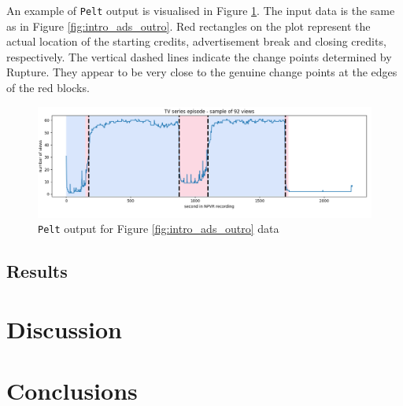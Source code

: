 An example of \texttt{Pelt} output is visualised in Figure \ref{fig:ruptures_change_detection}. The input data is the same as in Figure \ref{fig:intro_ads_outro}. Red rectangles on the plot represent the actual location of the starting credits, advertisement break and closing credits, respectively. The vertical dashed lines indicate the change points determined by Rupture. They appear to be very close to the genuine change points at the edges of the red blocks.

\begin{figure}[H]
\centering
\includegraphics[width=1\textwidth]{../plots/episode-pen100.png}
\caption{\texttt{Pelt} output for Figure \ref{fig:intro_ads_outro} data}
\label{fig:ruptures_change_detection}
\end{figure}

\subsection{Results} \label{sec:results}

\section{Discussion} \label{sec:discussion}

\section{Conclusions} \label{sec:conclusions}
